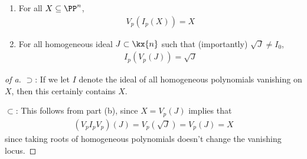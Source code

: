 \begin{proposition}

\envlist

\begin{enumerate}
\def\labelenumi{\alph{enumi}.}
\item
  For all \(X\subseteq \PP^n\),
  \begin{align*}
  V_p(I_p(X)) = X
  \end{align*}
\item
  For all homogeneous ideal \(J\subset \kx{n}\) such that (importantly)
  \(\sqrt{J} \neq I_0\),
  \begin{align*}
  I_p(V_p(J)) = \sqrt J
  \end{align*}
\end{enumerate}

\end{proposition}

\begin{proof}[of a]

\(\supset\): If we let \(I\) denote the ideal of all homogeneous
polynomials vanishing on \(X\), then this certainly contains \(X\).

\(\subset\): This follows from part (b), since \(X = V_p(J)\) implies
that
\begin{align*}
(V_p I_p V_p)(J) = V_p(\sqrt J) = V_p(J) = X
\end{align*} since taking roots of homogeneous polynomials doesn't
change the vanishing locus.

\end{proof}

